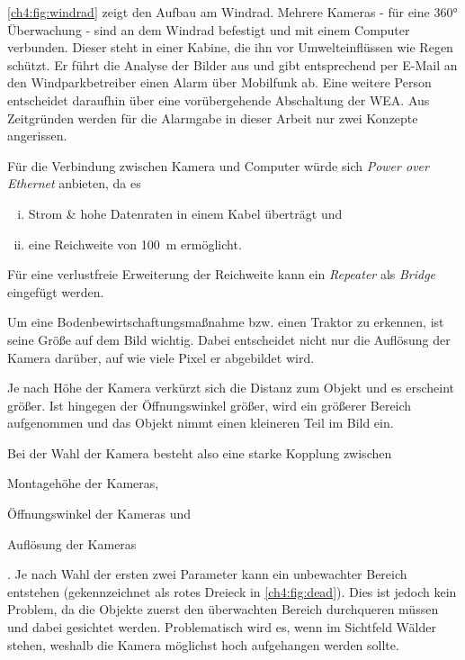 \autoref{ch4:fig:windrad} zeigt den Aufbau am Windrad.
Mehrere Kameras - für eine \ang{360} Überwachung - sind an dem Windrad befestigt und mit einem Computer verbunden.
Dieser steht in einer Kabine, die ihn vor Umwelteinflüssen wie Regen schützt.
Er führt die Analyse der Bilder aus und gibt entsprechend per E-Mail an den Windparkbetreiber einen Alarm über Mobilfunk ab.
Eine weitere Person entscheidet daraufhin über eine vorübergehende Abschaltung der \ac{WEA}.
Aus Zeitgründen werden für die Alarmgabe in dieser Arbeit nur zwei Konzepte angerissen.

Für die Verbindung zwischen Kamera und Computer würde sich \textit{Power over Ethernet} anbieten, da es
\begin{enumerate}[i)]
    \item Strom \& hohe Datenraten in einem Kabel überträgt und
    \item eine Reichweite von \SI{100}{\metre} ermöglicht.
\end{enumerate}
Für eine verlustfreie Erweiterung der Reichweite kann ein \textit{Repeater} als \textit{Bridge} eingefügt werden.

\bigskip
Um eine Bodenbewirtschaftungsmaßnahme bzw. einen Traktor zu erkennen, ist seine Größe auf dem Bild wichtig.
Dabei entscheidet nicht nur die Auflösung der Kamera darüber, auf wie viele Pixel er abgebildet wird.

Je nach Höhe der Kamera verkürzt sich die Distanz zum Objekt und es erscheint größer.
Ist hingegen der Öffnungswinkel größer, wird ein größerer Bereich aufgenommen und das Objekt nimmt einen kleineren Teil im Bild ein.

Bei der Wahl der Kamera besteht also eine starke Kopplung zwischen
\begin{enumerate*}[i)]
    \item{Montagehöhe der Kameras},
    \item{Öffnungswinkel der Kameras und}
    \item{Auflösung der Kameras}
\end{enumerate*}.
Je nach Wahl der ersten zwei Parameter kann ein unbewachter Bereich entstehen (gekennzeichnet als rotes Dreieck in \autoref{ch4:fig:dead}).
Dies ist jedoch kein Problem, da die Objekte zuerst den überwachten Bereich durchqueren müssen und dabei gesichtet werden.
Problematisch wird es, wenn im Sichtfeld Wälder stehen, weshalb die Kamera möglichst hoch aufgehangen werden sollte.

